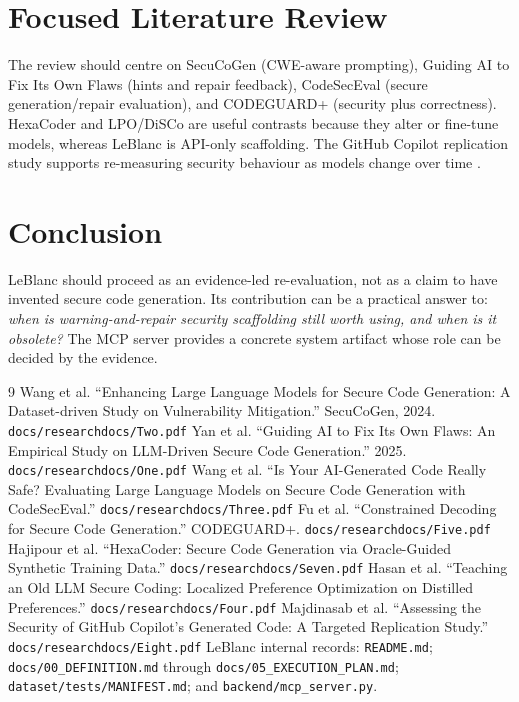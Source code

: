 \documentclass[11pt,a4paper]{article}
\begin{document}
\section{Focused Literature Review}
The review should centre on SecuCoGen (CWE-aware prompting), Guiding AI to Fix Its Own Flaws (hints and repair feedback), CodeSecEval (secure generation/repair evaluation), and CODEGUARD+ (security plus correctness). HexaCoder and LPO/DiSCo are useful contrasts because they alter or fine-tune models, whereas LeBlanc is API-only scaffolding. The GitHub Copilot replication study supports re-measuring security behaviour as models change over time \cite{hexacoder,lpo,copilot}.

\section{Conclusion}
LeBlanc should proceed as an evidence-led re-evaluation, not as a claim to have invented secure code generation. Its contribution can be a practical answer to: \emph{when is warning-and-repair security scaffolding still worth using, and when is it obsolete?} The MCP server provides a concrete system artifact whose role can be decided by the evidence.

\begin{thebibliography}{9}
 Wang et al. ``Enhancing Large Language Models for Secure Code Generation: A Dataset-driven Study on Vulnerability Mitigation.'' SecuCoGen, 2024. \texttt{docs/researchdocs/Two.pdf}
 Yan et al. ``Guiding AI to Fix Its Own Flaws: An Empirical Study on LLM-Driven Secure Code Generation.'' 2025. \texttt{docs/researchdocs/One.pdf}
 Wang et al. ``Is Your AI-Generated Code Really Safe? Evaluating Large Language Models on Secure Code Generation with CodeSecEval.'' \texttt{docs/researchdocs/Three.pdf}
 Fu et al. ``Constrained Decoding for Secure Code Generation.'' CODEGUARD+. \texttt{docs/researchdocs/Five.pdf}
 Hajipour et al. ``HexaCoder: Secure Code Generation via Oracle-Guided Synthetic Training Data.'' \texttt{docs/researchdocs/Seven.pdf}
 Hasan et al. ``Teaching an Old LLM Secure Coding: Localized Preference Optimization on Distilled Preferences.'' \texttt{docs/researchdocs/Four.pdf}
 Majdinasab et al. ``Assessing the Security of GitHub Copilot's Generated Code: A Targeted Replication Study.'' \texttt{docs/researchdocs/Eight.pdf}
 LeBlanc internal records: \texttt{README.md}; \texttt{docs/00\_DEFINITION.md} through \texttt{docs/05\_EXECUTION\_PLAN.md}; \texttt{dataset/tests/MANIFEST.md}; and \texttt{backend/mcp\_server.py}.
\end{thebibliography}
\end{document}
